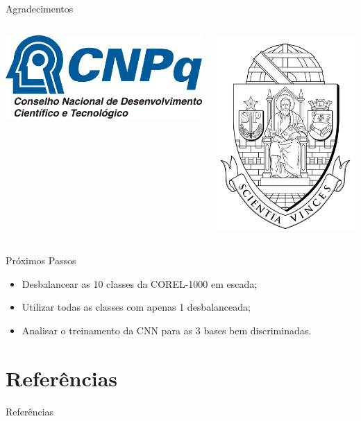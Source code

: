 \documentclass{beamer}
\begin{document}
\begin{frame}{Agradecimentos}
\begin{columns}
  \begin{column}{0.5\textwidth}
  \centering
    \includegraphics[width=0.6\columnwidth]{figuras/cnpqLogo.jpg}
  \end{column}
  \begin{column}{0.5\textwidth}
  \centering
    \includegraphics[width=0.6\columnwidth]{figuras/brasao_usp_pb}
  \end{column}
\end{columns}
\end{frame}
\begin{frame}{Próximos Passos}
  \begin{itemize}
  \item Desbalancear as 10 classes da COREL-1000 em escada;
  \item Utilizar todas as classes com apenas 1 desbalanceada;
  \item Analisar o treinamento da CNN para as 3 bases bem discriminadas.
  \end{itemize}
\end{frame}
\section{Referências}
\begin{frame}{Referências}
\end{frame}
\begin{frame}[plain]
  \maketitle
\end{frame}
\end{document}
